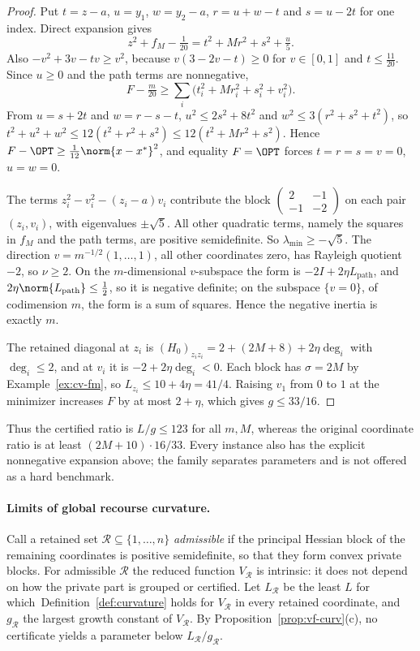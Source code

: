 \begin{proof}
Put $t=z-a$, $u=y_1$, $w=y_2-a$, $r=u+w-t$ and $s=u-2t$ for one index. Direct
expansion gives
\[
z^2+f_M-\tfrac1{20}=t^2+Mr^2+s^2+\tfrac u5.
\]
Also $-v^2+3v-tv\ge v^2$, because $v(3-2v-t)\ge0$ for $v\in[0,1]$ and
$t\le\frac{11}{20}$. Since $u\ge0$ and the path terms are nonnegative,
\[
F-\tfrac m{20}\ge\sum_i\bigl(t_i^2+Mr_i^2+s_i^2+v_i^2\bigr).
\]
From $u=s+2t$ and $w=r-s-t$, $u^2\le2s^2+8t^2$ and $w^2\le3(r^2+s^2+t^2)$, so
$t^2+u^2+w^2\le12(t^2+r^2+s^2)\le12(t^2+Mr^2+s^2)$. Hence
$F-\OPT\ge\frac1{12}\norm{x-x^*}^2$, and equality $F=\OPT$ forces
$t=r=s=v=0$, $u=w=0$.

The terms $z_i^2-v_i^2-(z_i-a)v_i$ contribute the block
$\left(\begin{smallmatrix}2&-1\\-1&-2\end{smallmatrix}\right)$ on each pair
$(z_i,v_i)$, with eigenvalues $\pm\sqrt5$. All other quadratic terms, namely
the squares in $f_M$ and the path terms, are positive semidefinite. So
$\lambda_{\min}\ge-\sqrt5$. The direction $v=m^{-1/2}(1,\ldots,1)$, all
other coordinates zero, has Rayleigh quotient $-2$, so $\nu\ge2$. On the
$m$-dimensional $v$-subspace the form is $-2I+2\eta L_{\mathrm{path}}$, and
$2\eta\norm{L_{\mathrm{path}}}\le\frac12$, so it is negative definite; on the
subspace $\{v=0\}$, of codimension $m$, the form is a sum of squares. Hence the
negative inertia is exactly $m$.

The retained diagonal at $z_i$ is
$(H_0)_{z_iz_i}=2+(2M+8)+2\eta\deg_i$ with $\deg_i\le2$, and at $v_i$ it is
$-2+2\eta\deg_i<0$. Each block has $\sigma=2M$ by Example~\ref{ex:cv-fm}, so
$L_{z_i}\le10+4\eta=41/4$. Raising $v_1$ from $0$ to $1$ at the minimizer
increases $F$ by at most $2+\eta$, which gives $g\le33/16$.
\end{proof}

Thus the certified ratio is $L/g\le123$ for all $m,M$, whereas the original
coordinate ratio is at least $(2M+10)\cdot16/33$. Every instance also has the
explicit nonnegative expansion above; the family separates parameters and is
not offered as a hard benchmark.



\paragraph{Limits of global recourse curvature.}

Call a retained set $\mathcal R\subseteq\{1,\ldots,n\}$ \emph{admissible} if the
principal Hessian block of the remaining coordinates is positive
semidefinite, so that they form convex private blocks. For admissible
$\mathcal R$ the reduced function $V_{\mathcal R}$ is intrinsic: it does not
depend on how the private part is grouped or certified. Let
$L_{\mathcal R}$ be the least $L$ for which~Definition~\ref{def:curvature} holds for
$V_{\mathcal R}$ in every retained coordinate, and $g_{\mathcal R}$ the largest
growth constant of $V_{\mathcal R}$. By Proposition~\ref{prop:vf-curv}(c), no
certificate yields a parameter below $L_{\mathcal R}/g_{\mathcal R}$.

